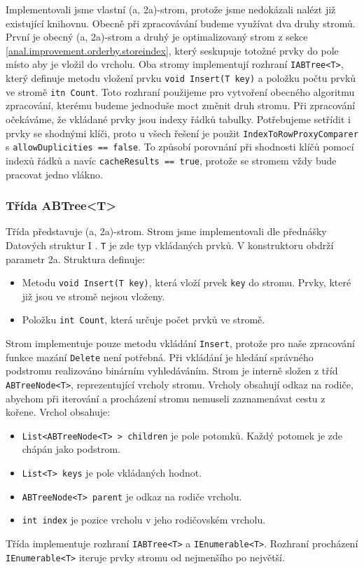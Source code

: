 Implementovali jsme vlastní (a, 2a)-strom, protože jsme nedokázali nalézt již existující knihovnu.
Obecně při zpracovávání budeme využívat dva druhy stromů.
První je obecný (a, 2a)-strom a druhý je optimalizovaný strom z sekce \ref{anal.improvement.orderby.storeindex}, který seskupuje totožné prvky do pole místo aby je vložil do vrcholu.
Oba stromy implementují rozhraní \texttt{IABTree<T>}, který definuje metodu vložení prvku \texttt{void Insert(T key)} a položku počtu prvků ve stromě \texttt{itn Count}.
Toto rozhraní použijeme pro vytvoření obecného algoritmu zpracování, kterému budeme jednoduše moct změnit druh stromu.
Při zpracování očekáváme, že vkládané prvky jsou indexy řádků tabulky.
Potřebujeme setřídit i prvky se shodnými klíči, proto u všech řešení je použit \texttt{IndexToRowProxyComparer} s \texttt{allowDuplicities == false}.
To způsobí porovnání při shodnosti klíčů pomocí indexů řádků a navíc \texttt{cacheResults == true}, protože se stromem vždy bude pracovat jedno vlákno.

\subsubsection{Třída ABTree<T>}

Třída představuje (a, 2a)-strom.
Strom jsme implementovali dle přednášky Datových struktur I \citep[03. (a, b)-trees str. 6]{dataLecture}.
\texttt{T} je zde typ vkládaných prvků.
V konstruktoru obdrží parametr 2a.
Struktura definuje:
\begin{itemize}
\item Metodu \texttt{void Insert(T key)}, která vloží prvek \texttt{key} do stromu.
Prvky, které již jsou ve stromě nejsou vloženy.
\item Položku \texttt{int Count}, která určuje počet prvků ve stromě.
\end{itemize}
Strom implementuje pouze metodu vkládání \texttt{Insert}, protože pro naše zpracování funkce mazání \texttt{Delete} není potřebná.
Při vkládání je hledání správného podstromu realizováno binárním vyhledáváním.
Strom je interně složen z tříd \texttt{ABTreeNode<T>}, reprezentující vrcholy stromu.
Vrcholy obsahují odkaz na rodiče, abychom při iterování a procházení stromu nemuseli zaznamenávat cestu z kořene.
Vrchol obsahuje:
\begin{itemize}
\item \texttt{List<ABTreeNode<T> > children} je pole potomků. Každý potomek je zde chápán jako podstrom.
\item \texttt{List<T> keys} je pole vkládaných hodnot.
\item \texttt{ABTreeNode<T> parent} je odkaz na rodiče vrcholu.
\item \texttt{int index} je pozice vrcholu v jeho rodičovském vrcholu.
\end{itemize}
Třída implementuje rozhraní \texttt{IABTree<T>} a \texttt{IEnumerable<T>}.
Rozhraní procházení \texttt{IEnumerable<T>} iteruje prvky stromu od nejmenšího po největší.

